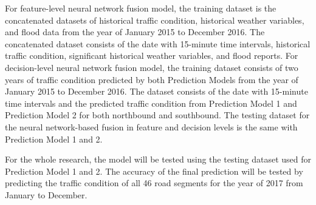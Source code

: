 For feature-level neural network fusion model, the training dataset is the concatenated datasets of historical traffic condition, historical weather variables, and flood data from the year of January 2015 to December 2016. The concatenated dataset consists of the date with 15-minute time intervals, historical traffic condition, significant historical weather variables, and flood reports. For decision-level neural network fusion model, the training dataset consists of two years of traffic condition predicted by both Prediction Models from the year of January 2015 to December 2016. The dataset consists of the date with 15-minute time intervals and the predicted traffic condition from Prediction Model 1 and Prediction Model 2 for both northbound and southbound. The testing dataset for the neural network-based fusion in feature and decision levels is the same with Prediction Model 1 and 2. 

For the whole research, the model will be tested using the testing dataset used for Prediction Model 1 and 2. The accuracy of the final prediction will be tested by predicting the traffic condition of all 46 road segments for the year of 2017 from January to December.
